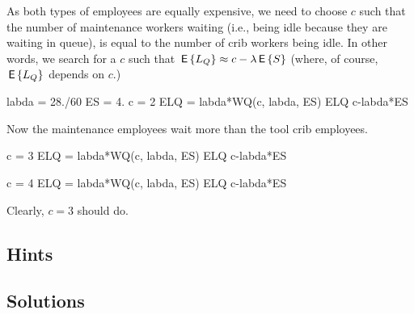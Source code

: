 \begin{exercise}
\begin{solution}
\begin{enumerate}
As both types of
employees are equally expensive, we need to choose $c$ such that
the number of maintenance workers waiting (i.e., being idle because they are waiting in queue), is  equal to the number of crib workers being idle. In other words, we search for a $c$ such that $\,\mathsf{E}\left\{L_Q\right\} \approx c- \lambda \,\mathsf{E}\left\{S\right\}$ (where, of course, $\,\mathsf{E}\left\{L_Q\right\}$ depends on $c$.)


\begin{pyconsole}
labda = 28./60
ES = 4.
c = 2
ELQ = labda*WQ(c, labda, ES)
ELQ
c-labda*ES
\end{pyconsole} 
Now the maintenance employees wait more than the tool crib employees.

\begin{pyconsole}
c = 3
ELQ = labda*WQ(c, labda, ES)
ELQ
c-labda*ES
\end{pyconsole} 

\begin{pyconsole}
c = 4
ELQ = labda*WQ(c, labda, ES)
ELQ
c-labda*ES
\end{pyconsole} 

Clearly, $c=3$ should do.
  \end{enumerate}
    \end{solution}
\end{exercise}



\subsection*{Hints}

\subsection*{Solutions}

\clearpage

